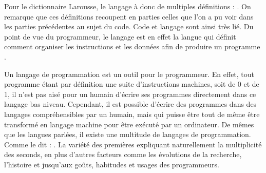 \documentclass[12pt]{article} %
\begin{document}
Pour le dictionnaire Larousse, le langage à donc de multiples définitions :
\cite{Nimmo2017-ya}. On remarque que ces définitions recoupent en parties celles que l'on a pu voir dans les parties précédentes au sujet du code. Code et langage sont ainsi très lié. Du point de vue du programmeur, le langage est en effet la langue qui définit comment organiser les instructions et les données afin de produire un programme \cite{BernardAmade2019}.

Un langage de programmation est un outil pour le programmeur. En effet, tout programme étant par définition une suite d'instructions machines, soit de 0 et de 1, il n'est pas aisé pour un humain d'écrire ses programmes directement dans ce langage bas niveau. Cependant, il est possible d'écrire des programmes dans des langages compréhensibles par un humain, mais qui puisse être tout de même être transformé en langage machine pour être exécuté par un ordinateur. De mêmes que les langues parlées, il existe une multitude de langages de programmation. Comme le dit \citeauthor{BernardAmade2019} :  \cite{BernardAmade2019}. La variété des premières expliquant naturellement la multiplicité des seconds, en plus d'autres facteurs comme les évolutions de la recherche, l'histoire et jusqu'aux goûts, habitudes et usages des programmeurs.
\end{document}

